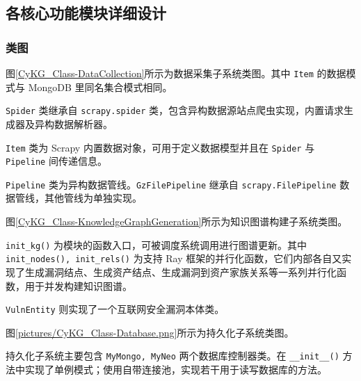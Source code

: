 \documentclass[a4paper,AutoFakeBold,oneside,12pt]{book}
\begin{document}
\subsection{各核心功能模块详细设计}

\subsubsection{类图}


图\ref{CyKG_Class-DataCollection}所示为数据采集子系统类图。其中 \lstinline|Item| 的数据模式与 MongoDB 里同名集合模式相同。

\lstinline|Spider| 类继承自 \lstinline|scrapy.spider| 类，包含异构数据源站点爬虫实现，内置请求生成器及异构数据解析器。

\lstinline|Item| 类为 Scrapy 内置数据对象，可用于定义数据模型并且在 \lstinline|Spider| 与 \lstinline|Pipeline| 间传递信息。

\lstinline|Pipeline| 类为异构数据管线。\lstinline|GzFilePipeline| 继承自 \lstinline|scrapy.FilePipeline| 数据管线，其他管线为单独实现。



图\ref{CyKG_Class-KnowledgeGraphGeneration}所示为知识图谱构建子系统类图。

\lstinline|init_kg()| 为模块的函数入口，可被调度系统调用进行图谱更新。其中 \lstinline|init_nodes(), init_rels()| 为支持 Ray 框架的并行化函数，它们内部各自又实现了生成漏洞结点、生成资产结点、生成漏洞到资产家族关系等一系列并行化函数，用于并发构建知识图谱。

\lstinline|VulnEntity| 则实现了一个互联网安全漏洞本体类。


图\ref{pictures/CyKG_Class-Database.png}所示为持久化子系统类图。

持久化子系统主要包含 \lstinline|MyMongo, MyNeo| 两个数据库控制器类。在 \lstinline|__init__()| 方法中实现了单例模式；使用自带连接池，实现若干用于读写数据库的方法。
\end{document}
